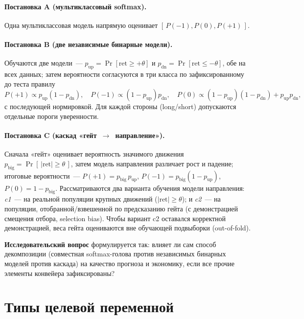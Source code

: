 \documentclass[12pt,a4paper]{report}
\begin{document}
\paragraph{Постановка A (мультиклассовый softmax).} Одна мультиклассовая модель
напрямую оценивает $[\,P(-1),P(0),P(+1)\,]$.

\paragraph{Постановка B (две независимые бинарные модели).} Обучаются две модели~---
$p_{\text{up}}=\Pr[\mathrm{ret}\ge+\theta]$ и $p_{\text{dn}}=\Pr[\mathrm{ret}\le-\theta]$,
обе на всех данных; затем вероятности согласуются в три класса по
зафиксированному до теста правилу
\[
P(+1)\propto p_{\text{up}}(1-p_{\text{dn}}),\quad
P(-1)\propto (1-p_{\text{up}})p_{\text{dn}},\quad
P(0)\propto (1-p_{\text{up}})(1-p_{\text{dn}})+p_{\text{up}}p_{\text{dn}},
\]
с последующей нормировкой. Для каждой стороны (long/short) допускаются отдельные
пороги уверенности.

\paragraph{Постановка C (каскад «гейт~$\to$~направление»).} Сначала «гейт»
оценивает вероятность значимого движения $p_{\text{big}}=\Pr[\,|\mathrm{ret}|\ge\theta\,]$,
затем модель направления различает рост и падение; итоговые вероятности~---
$P(+1)=p_{\text{big}}\,p_{\text{up}}$, $P(-1)=p_{\text{big}}(1-p_{\text{up}})$,
$P(0)=1-p_{\text{big}}$. Рассматриваются два варианта обучения модели направления:
\emph{c1}~--- на реальной популяции крупных движений ($|\mathrm{ret}|\ge\theta$); и
\emph{c2}~--- на популяции, отобранной/взвешенной по предсказанию гейта (с
демонстрацией смещения отбора, selection bias). Чтобы вариант c2 оставался
корректной демонстрацией, веса гейта оцениваются вне обучающей подвыборки
(out-of-fold).

\textbf{Исследовательский вопрос} формулируется так: влияет ли сам способ
декомпозиции (совместная softmax-голова против независимых бинарных моделей против
каскада) на качество прогноза и экономику, если все прочие элементы конвейера
зафиксированы?

\section{Типы целевой переменной}
\label{sec:targets}
\end{document}
